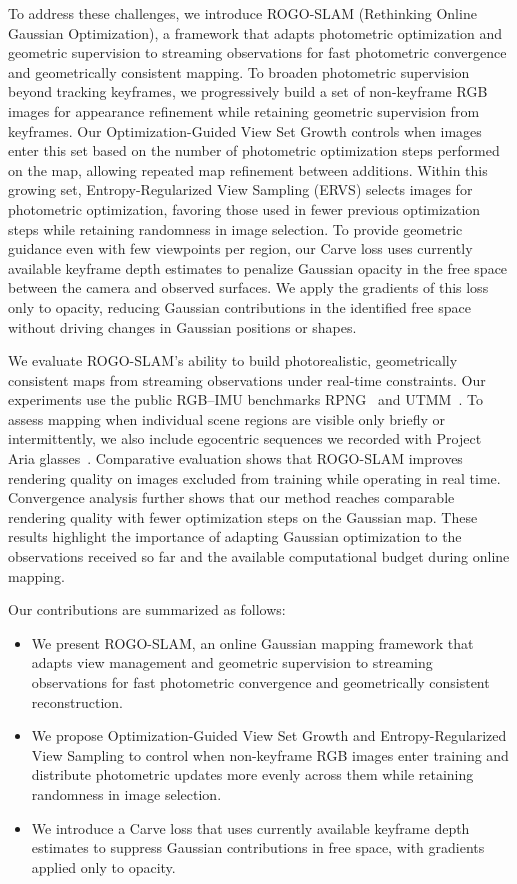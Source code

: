 To address these challenges, we introduce ROGO-SLAM (Rethinking Online Gaussian Optimization), a framework that adapts photometric optimization and geometric supervision to streaming observations for fast photometric convergence and geometrically consistent mapping.
To broaden photometric supervision beyond tracking keyframes, we progressively build a set of non-keyframe RGB images for appearance refinement while retaining geometric supervision from keyframes.
Our Optimization-Guided View Set Growth controls when images enter this set based on the number of photometric optimization steps performed on the map, allowing repeated map refinement between additions.
Within this growing set, Entropy-Regularized View Sampling (ERVS) selects images for photometric optimization, favoring those used in fewer previous optimization steps while retaining randomness in image selection.
To provide geometric guidance even with few viewpoints per region, our Carve loss uses currently available keyframe depth estimates to penalize Gaussian opacity in the free space between the camera and observed surfaces.
We apply the gradients of this loss only to opacity, reducing Gaussian contributions in the identified free space without driving changes in Gaussian positions or shapes.

We evaluate ROGO-SLAM's ability to build photorealistic, geometrically consistent maps from streaming observations under real-time constraints.
Our experiments use the public RGB--IMU benchmarks RPNG~\cite{chen2023monocular} and UTMM~\cite{sun2024mm3dgs}.
To assess mapping when individual scene regions are visible only briefly or intermittently, we also include egocentric sequences we recorded with Project Aria glasses~\cite{engel2023aria}.
Comparative evaluation shows that ROGO-SLAM improves rendering quality on images excluded from training while operating in real time.
Convergence analysis further shows that our method reaches comparable rendering quality with fewer optimization steps on the Gaussian map.
These results highlight the importance of adapting Gaussian optimization to the observations received so far and the available computational budget during online mapping.

Our contributions are summarized as follows:
\begin{itemize}
    \item We present ROGO-SLAM, an online Gaussian mapping framework that adapts view management and geometric supervision to streaming observations for fast photometric convergence and geometrically consistent reconstruction.
    \item We propose Optimization-Guided View Set Growth and Entropy-Regularized View Sampling to control when non-keyframe RGB images enter training and distribute photometric updates more evenly across them while retaining randomness in image selection.
    \item We introduce a Carve loss that uses currently available keyframe depth estimates to suppress Gaussian contributions in free space, with gradients applied only to opacity.
\end{itemize}

